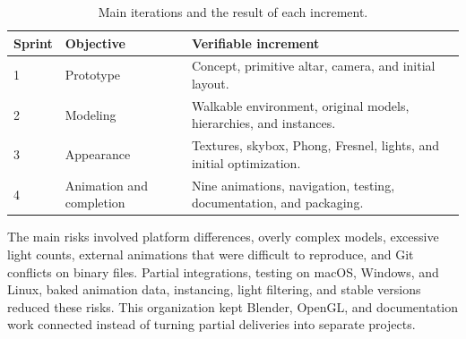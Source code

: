 \documentclass[letter,12pt]{article}
\begin{document}
	\begin{table}[H]
		\centering
		\small
		\begin{tabularx}{0.96\textwidth}{p{1.4cm}p{3.5cm}X}
			\toprule
			\textbf{Sprint} & \textbf{Objective} & \textbf{Verifiable increment}\\
			\midrule
			1 & Prototype & Concept, primitive altar, camera, and initial layout.\\
			2 & Modeling & Walkable environment, original models, hierarchies, and instances.\\
			3 & Appearance & Textures, skybox, Phong, Fresnel, lights, and initial optimization.\\
			4 & Animation and completion & Nine animations, navigation, testing, documentation, and packaging.\\
			\bottomrule
		\end{tabularx}
		\caption{Main iterations and the result of each increment.}
		\label{tab:sprints}
	\end{table}

	The main risks involved platform differences, overly complex models, excessive
	light counts, external animations that were difficult to reproduce, and Git
	conflicts on binary files. Partial integrations, testing on macOS, Windows, and
	Linux, baked animation data, instancing, light filtering, and stable versions
	reduced these risks. This organization kept Blender, OpenGL, and documentation
	work connected instead of turning partial deliveries into separate projects.
\end{document}
